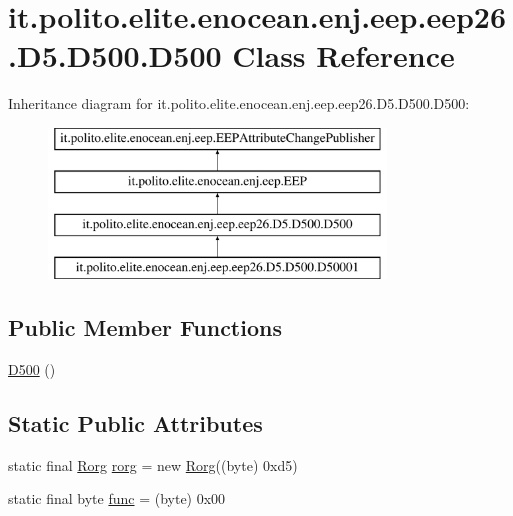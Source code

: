 \hypertarget{classit_1_1polito_1_1elite_1_1enocean_1_1enj_1_1eep_1_1eep26_1_1_d5_1_1_d500_1_1_d500}{}\section{it.\+polito.\+elite.\+enocean.\+enj.\+eep.\+eep26.\+D5.\+D500.\+D500 Class Reference}
\label{classit_1_1polito_1_1elite_1_1enocean_1_1enj_1_1eep_1_1eep26_1_1_d5_1_1_d500_1_1_d500}
Inheritance diagram for it.\+polito.\+elite.\+enocean.\+enj.\+eep.\+eep26.\+D5.\+D500.\+D500\+:\begin{figure}[H]
\begin{center}
\leavevmode
\includegraphics[height=4.000000cm]{classit_1_1polito_1_1elite_1_1enocean_1_1enj_1_1eep_1_1eep26_1_1_d5_1_1_d500_1_1_d500}
\end{center}
\end{figure}
\subsection*{Public Member Functions}
\begin{DoxyCompactItemize}
\item 
\hyperlink{classit_1_1polito_1_1elite_1_1enocean_1_1enj_1_1eep_1_1eep26_1_1_d5_1_1_d500_1_1_d500_abf3e46e0ef7ff4e145f7032e0a5449c9}{D500} ()
\end{DoxyCompactItemize}
\subsection*{Static Public Attributes}
\begin{DoxyCompactItemize}
\item 
static final \hyperlink{classit_1_1polito_1_1elite_1_1enocean_1_1enj_1_1eep_1_1_rorg}{Rorg} \hyperlink{classit_1_1polito_1_1elite_1_1enocean_1_1enj_1_1eep_1_1eep26_1_1_d5_1_1_d500_1_1_d500_a629e039f7cecf53f506aacb8df473b43}{rorg} = new \hyperlink{classit_1_1polito_1_1elite_1_1enocean_1_1enj_1_1eep_1_1_rorg}{Rorg}((byte) 0xd5)
\item 
static final byte \hyperlink{classit_1_1polito_1_1elite_1_1enocean_1_1enj_1_1eep_1_1eep26_1_1_d5_1_1_d500_1_1_d500_af61bd7ce5c48541d40f2f74c700225ef}{func} = (byte) 0x00
\end{DoxyCompactItemize}
